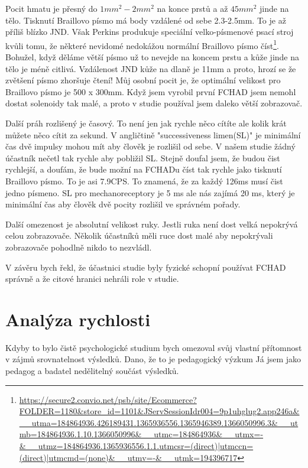 Pocit hmatu je přesný do ${}1mm^2 - 2mm^2$ na konce prstů a až ${}45mm^2$ jinde na tělo.  Tisknutí Braillovo písmo má body vzdálené od sebe 2.3-2.5mm\citep{brailleautority}. To je až příliš blízko JND.  Však Perkins produkuje speciální velko-písmenové psací stroj kvůli tomu, že některé nevidomé nedokážou normální Braillovo písmo číst\footnote{\url{https://secure2.convio.net/psb/site/Ecommerce?FOLDER=1180&store_id=1101&JServSessionIdr004=9p1uhglug2.app246a&__utma=184864936.426189431.1365936556.1365946389.1366050996.3&__utmb=184864936.1.10.1366050996&__utmc=184864936&__utmx=-&__utmz=184864936.1365936556.1.1.utmcsr=(direct)|utmccn=(direct)|utmcmd=(none)&__utmv=-&__utmk=194396717}}.  Bohužel, když děláme větší písmo už to nevejde na koncem prstu a kůže jinde na tělo je méně citlivá.  Vzdálenost JND kůže na dlaně je 11mm a proto, hrozí se že zvětšení písmo zhoršuje čtení! Můj osobní pocit je, že optimální velikost pro Braillovo písmo je 500 x 300mm.  Když jsem vyrobil první FCHAD jsem nemohl dostat solenoidy tak malé, a proto v studie používal jsem daleko větší zobrazovač\citep[str. 30-32]{nielsen2008gesture}.

Další práh rozlišený je časový.  To není jen jak rychle něco cítíte ale kolik krát můžete něco cítit za sekund.  V angličtině "successiveness limen(SL)" je minimální čas dvě impulsy mohou mít aby člověk je rozlišil od sebe.  V našem studie žádný účastník nečetl tak rychle aby pobližil SL.  Stejně doufal jsem, že budou čist rychlejší, a doufám, že bude možní na FCHADu číst tak rychle jako tisknutí Braillovo písmo.  To je asi 7.9CPS\citep{wetzel2006studies}.  To znamená, že za každý 126ms musí čist jedno písmeno.  SL pro mechanoreceptory je 5 ms ale nás zajímá 20 ms, který je minimální čas aby člověk dvě pocity rozlišil ve správném pořady\citep[str. 32]{nielsen2008gesture}.

Další omezenost je absolutní velikost ruky.  Jestli ruka není dost velká nepokrývá celou zobrazovače.  Několik účastníků měli ruce dost malé aby nepokrývali zobrazovače pohodlně nikdo to nezvládl.

V závěru bych řekl, že účastnici studie byly fyzické schopní používat FCHAD správně a že citové hranici nehráli role v studie.

\section{Analýza rychlosti}
Kdyby to bylo čistě psychologické studium bych omezoval svůj vlastní přítomnost v zájmů srovnatelnost výsledků.  Dano, že to je pedagogický výzkum Já jsem jako pedagog a badatel nedělitelný součást výsledků.

